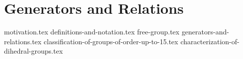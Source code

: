 \chapter{Generators and Relations}
{motivation.tex}
{definitions-and-notation.tex}
{free-group.tex}
{generators-and-relations.tex}
{classification-of-groups-of-order-up-to-15.tex}
{characterization-of-dihedral-groups.tex}
